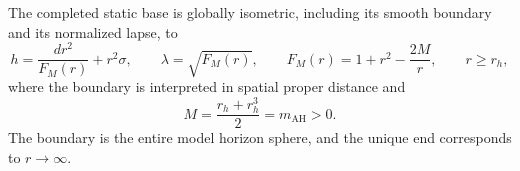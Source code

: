 \begin{theorem}
\label{hw-static-rigidity}
The completed static base is globally isometric, including its smooth
boundary and its normalized lapse, to
\begin{equation}\label{hw-global-model}
 h=\frac{dr^2}{F_M(r)}+r^2\sigma,\qquad
 \lambda=\sqrt{F_M(r)},\qquad
 F_M(r)=1+r^2-\frac{2M}{r},\qquad r\geq r_h,
\end{equation}
where the boundary is interpreted in spatial proper distance and
\begin{equation}\label{hw-actual-parameter}
 M=\frac{r_h+r_h^3}{2}=m_{\mathrm{AH}}>0.
\end{equation}
The boundary is the entire model horizon sphere, and the unique end
corresponds to $r\to\infty$.
\end{theorem}

